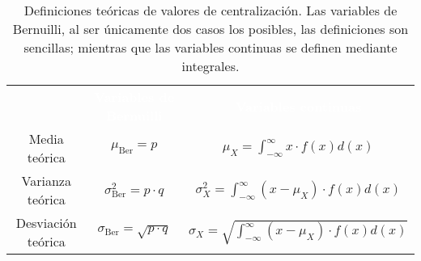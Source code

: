 \begin{table}[H]
    \begin{tabular}{ccc}
        \rowcolor{black}&\textcolor{white}{\textbf{Variables de Bernuilli}}&\textcolor{white}{\textbf{Variables continuas}}\\
        Media teórica&$\mu_{\mbox{Ber}} = p$&$\mu_X = \int_{-\infty}^{\infty}x\cdot f\left( x\right) d\left( x\right) $\\
        \rowcolor{hiperlightgray}Varianza teórica&$\sigma_{\mbox{Ber}}^2 = p\cdot q$&$\sigma_X^2 = \int_{-\infty}^{\infty}\left( x -\mu_X\right) \cdot f\left( x\right) d\left( x\right) $\\
        Desviación teórica&$\sigma_{\mbox{Ber}} = \sqrt{p\cdot q}$&$\sigma_X =\sqrt{\int_{-\infty}^{\infty}\left( x -\mu_X\right) \cdot f\left( x\right) d\left( x\right)}$\\
        \hline
    \end{tabular}
    \caption[Definiciones teóricas de valores de centralización]{Definiciones teóricas de valores de centralización. Las variables de Bernuilli, al ser únicamente dos casos los posibles, las definiciones son sencillas; mientras que las variables continuas se definen mediante integrales.}
\end{table}
